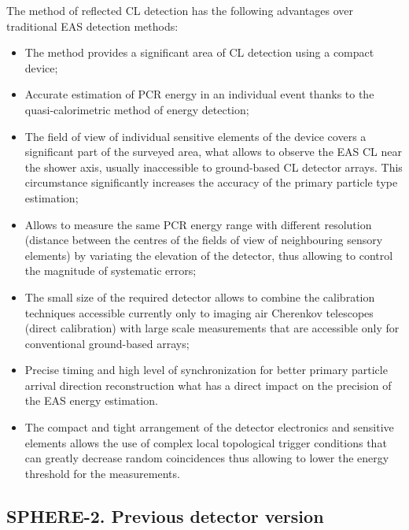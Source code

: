 \documentclass[a4paper,11pt]{article}
\begin{document}
The method of reflected CL detection has the following advantages over traditional EAS detection methods:
\begin{itemize}
\item The method provides a significant area of CL detection using a compact device;
\item Accurate estimation of PCR energy in an individual event thanks to the quasi-calorimetric method of energy detection;
\item The field of view of individual sensitive elements of the device covers a significant part of the surveyed area, what allows to observe the EAS CL near the shower axis, usually inaccessible to ground-based CL detector arrays. This circumstance significantly increases the accuracy of the primary particle type estimation;
\item Allows to measure the same PCR energy range with different resolution (distance between the centres of the fields of view of neighbouring sensory elements) by variating the elevation of the detector, thus allowing to control the magnitude of systematic errors;
\item The small size of the required detector allows to combine the calibration techniques accessible currently only to imaging air Cherenkov telescopes (direct calibration) with large scale measurements that are accessible only for conventional ground-based arrays;
\item Precise timing and high level of synchronization for better primary particle arrival direction reconstruction what has a direct impact on the precision of the EAS energy estimation.
\item The compact and tight arrangement of the detector electronics and sensitive elements allows the use of complex local topological trigger conditions that can greatly decrease random coincidences thus allowing to lower the energy threshold for the measurements.
\end{itemize}

\subsection{SPHERE-2. Previous detector version}
\end{document}
